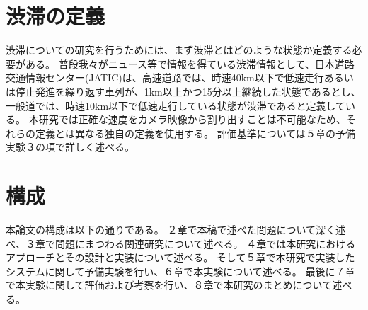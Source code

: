 \section{渋滞の定義}
渋滞についての研究を行うためには、まず渋滞とはどのような状態か定義する必要がある。
普段我々がニュース等で情報を得ている渋滞情報として、日本道路交通情報センター(JATIC)は、高速道路では、時速40km以下で低速走行あるいは停止発進を繰り返す車列が、1km以上かつ15分以上継続した状態であるとし、一般道では、時速10km以下で低速走行している状態が渋滞であると定義している。
本研究では正確な速度をカメラ映像から割り出すことは不可能なため、それらの定義とは異なる独自の定義を使用する。
評価基準については５章の予備実験３の項で詳しく述べる。


\section{構成}
本論文の構成は以下の通りである。
２章で本稿で述べた問題について深く述べ、３章で問題にまつわる関連研究について述べる。
４章では本研究におけるアプローチとその設計と実装について述べる。
そして５章で本研究で実装したシステムに関して予備実験を行い、６章で本実験について述べる。
最後に７章で本実験に関して評価および考察を行い、８章で本研究のまとめについて述べる。